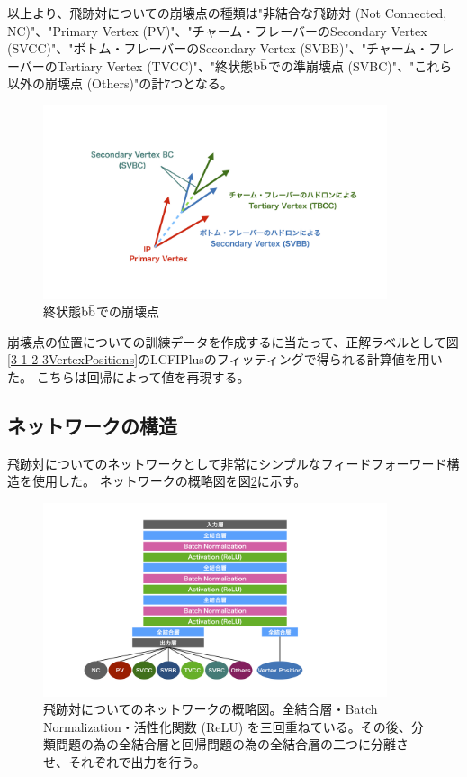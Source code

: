 以上より、飛跡対についての崩壊点の種類は"非結合な飛跡対 (Not Connected, NC)"、"Primary Vertex (PV)"、"チャーム・フレーバーのSecondary Vertex (SVCC)"、"ボトム・フレーバーのSecondary Vertex (SVBB)"、"チャーム・フレーバーのTertiary Vertex (TVCC)"、"終状態$\rm b\bar{b}$での準崩壊点 (SVBC)"、"これら以外の崩壊点 (Others)"の計$7$つとなる。

\begin{figure}[htbp]
 \centering
 \includegraphics[trim = 200 150 200 150, width=0.9\textwidth, clip]{Figure/3Networks/3-3-0-1SecondaryVertexBC.png}
 \caption{終状態$\rm b\bar{b}$での崩壊点}
 \label{3-3-0-1SecondaryVertexBC}
\end{figure}

崩壊点の位置についての訓練データを作成するに当たって、正解ラベルとして図\ref{3-1-2-3VertexPositions}のLCFIPlusのフィッティングで得られる計算値を用いた。
こちらは回帰によって値を再現する。


\subsection{ネットワークの構造} \label{Net:PM:StructureofPM}

飛跡対についてのネットワークとして非常にシンプルなフィードフォーワード構造を使用した。
ネットワークの概略図を図\ref{3-3-1-1PairModel}に示す。

\begin{figure}[htbp]
 \centering
 \includegraphics[trim = 200 50 200 50, width=0.9\textwidth, clip]{Figure/3Networks/3-3-1-1PairModel.png}
 \caption[飛跡対についてのネットワークの概略図]{飛跡対についてのネットワークの概略図。全結合層・Batch Normalization・活性化関数 (ReLU) を三回重ねている。その後、分類問題の為の全結合層と回帰問題の為の全結合層の二つに分離させ、それぞれで出力を行う。}
 \label{3-3-1-1PairModel}
\end{figure}

